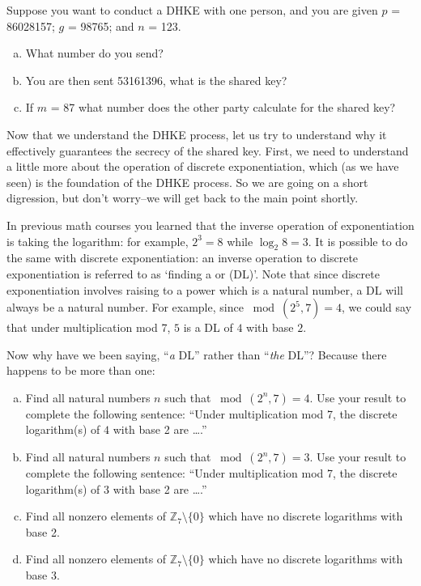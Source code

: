 \begin{exer}
Suppose you want to conduct a DHKE with one person, and you are given $p$ = 86028157; $g$ = 98765; and $n$ = 123.  
\begin{enumerate}[(a)]
\item	What number do you send?  

\item You are then sent 53161396, what is the shared key? 

\item If $m$ = 87 what number does the other party calculate for the shared key?
\end{enumerate}
\end{exer}
Now that we understand the DHKE process, let us try to understand why it effectively guarantees the secrecy of the shared key. First, we need to understand a little more about the operation of discrete exponentiation, which (as we have seen) is the foundation of the DHKE process. So we are going on a short digression, but don't worry--we will get back to the main point shortly. 

In previous math courses you learned that the inverse operation of exponentiation is taking the logarithm: for example, $2^3 = 8$ while $\log_{2}8 = 3$.  It is possible to do the same with discrete exponentiation: an inverse operation to discrete exponentiation is  referred to as `finding a  or (DL)'. Note that since discrete exponentiation involves raising to a power which is a natural number, a  DL will always be a natural number.   For example, since $\bmod(2^5,7)=4$, we could say that under multiplication mod 7,  $5$ is a DL  of $4$ with base $2$.

 Now why have we been saying, ``\emph{a} DL'' rather than ``\emph{the} DL''? Because  there happens to be more than one:

\begin{exercise}\label{exercise:further_crypt:DLex1}
\begin{enumerate}[(a)]
\item
Find all natural numbers $n$ such that $\bmod(2^n,7)=4$.  Use your result to complete the following sentence: ``Under multiplication mod 7, the discrete logarithm(s) of $4$ with base 2  are \ldots.''
\item
Find all natural numbers $n$ such that $\bmod(2^n,7)=3$.  Use your result to complete the following sentence:  ``Under multiplication mod 7, the discrete logarithm(s) of $3$ with base 2 are \ldots.''
\item
Find all nonzero elements of $\mathbb{Z}_7 \setminus \{0\}$ which have no discrete logarithms with base 2.
\item
Find all nonzero elements of $\mathbb{Z}_7 \setminus \{0\}$ which have no discrete logarithms with base 3.
\end{enumerate}
\end{exercise}

